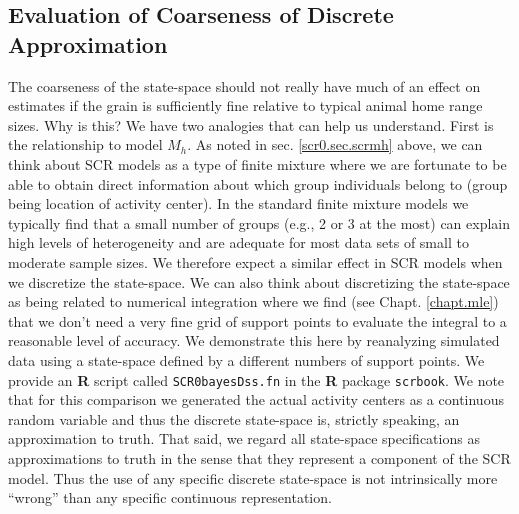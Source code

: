 {{\subsection{Evaluation of Coarseness of Discrete Approximation}

The coarseness of the state-space should not really have much of an
effect on estimates if the grain is sufficiently fine relative to
typical animal home range sizes.  Why is this?  We have two analogies
that can help us understand. First is the relationship to model
$M_{h}$.  As noted in sec. \ref{scr0.sec.scrmh} above, we can think
about SCR models as a type of finite mixture
\citep{norris_pollock:1996, pledger:2000} where we are fortunate to be
able to obtain direct information about which group individuals belong
to (group being location of activity center).  In the standard finite
mixture models we typically find that a small number of groups (e.g.,
2 or 3 at the most) can explain  high levels of heterogeneity
and are adequate for most data sets of small to moderate sample
sizes. We therefore expect a similar effect in SCR models when we
discretize the state-space.  We can also think about discretizing the
state-space as being related to numerical integration where we find
(see Chapt. \ref{chapt.mle}) that we don't need a very fine grid of
support points to evaluate the integral to a reasonable level of
accuracy. We demonstrate this here by reanalyzing simulated data using
a state-space defined by a different numbers of support points.  We
provide an {\bf R} script called \mbox{\tt SCR0bayesDss.fn} in the
{\bf R} package \mbox{\tt scrbook}.  We note that for this comparison
we generated the actual activity centers as a continuous random
variable and thus the discrete state-space is, strictly speaking, an
approximation to truth. That said, we regard all state-space
specifications as approximations to truth in the sense that they
represent a component of the SCR model.  Thus the use of any specific
discrete state-space is not intrinsically more ``wrong'' than any
specific continuous representation.

}}
